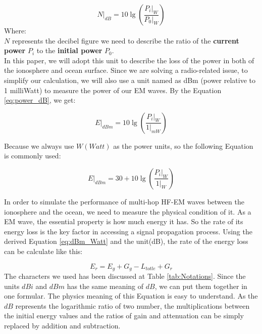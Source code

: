 \documentclass{mcmthesis}
\begin{document}
      \begin{equation}\label{eq:power_dB}
        N|_{dB} = 10 \lg(\frac{P_{i}|_{W}}{P_{0}|_{W}})
      \end{equation}
      Where: \\
      $N$ represents the decibel figure we need to describe the ratio of the \textbf{current power} $P_{i}$ to the \textbf{initial power} $P_{0}$.\\

    In this paper, we will adopt this unit to describe the loss of the power in both of the ionosphere and ocean surface. Since we are solving a radio-related issue, to simplify our calculation, we will also use a unit named as dBm (power relative to 1 milliWatt) to measure the power of our EM waves. By the Equation \ref{eq:power_dB}, we get:

      \begin{equation}\label{eq:dBm_milliWatt}
        E |_{dBm} = 10 \lg(\frac{P_{i}|_{W}}{1 |_{mW} })
      \end{equation}

    Because we always use $W(Watt)$ as the power units, so the following Equation is commonly used:

      \begin{equation}\label{eq:dBm_Watt}
        E |_{dBm} = 30 + 10 \lg(\frac{P_{i}|_{W}}{1 |_{W} })
      \end{equation}

    In order to simulate the performance of multi-hop HF-EM waves between the ionosphere and the ocean, we need to measure the physical condition of it. As a EM wave, the essential property is how much energy it has. So the rate of its energy loss is the key factor in accessing a signal propagation process. Using the derived Equation \ref{eq:dBm_Watt} and the unit(dB), the rate of the energy loss can be calculate like this:

      \begin{equation}\label{eq:transmitting}
        E_{r} = E_{g} + G_{g} - L_{totle} + G_{r}
      \end{equation}
      The characters we used has been discussed at Table \ref{tab:Notations}. Since the units \emph{$dBi$} and \emph{$dBm$} has the same meaning of \emph{$dB$}, we can put them together in one formular. The physics meaning of this Equation is easy to understand. As the \emph{$dB$} represents the logarithmic ratio of two number, the multiplications between the initial energy values and the ratios of gain and attenuation can be simply replaced by addition and subtraction.
\end{document}
